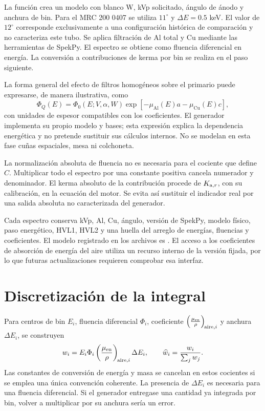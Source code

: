 La función  crea un modelo con blanco W, kVp solicitado, ángulo de ánodo y anchura de bin. Para el MRC 200 0407 se utiliza $11^\circ$ y $\Delta E=\num{0.5}$ keV. El valor de $12^\circ$ corresponde exclusivamente a una configuración histórica de comparación y no caracteriza este tubo. Se aplica filtración de Al total y Cu mediante las herramientas de SpekPy. El espectro se obtiene como fluencia diferencial en energía. La conversión a contribuciones de kerma por bin se realiza en el paso siguiente.

La forma general del efecto de filtros homogéneos sobre el primario puede expresarse, de manera ilustrativa, como
\begin{equation}
\Phi_Q(E)=\Phi_0(E;V,\alpha,W)\exp[-\mu_{\mathrm{Al}}(E)a-\mu_{\mathrm{Cu}}(E)c],
\end{equation}
con unidades de espesor compatibles con los coeficientes. El generador implementa su propio modelo y bases; esta expresión explica la dependencia energética y no pretende sustituir sus cálculos internos. No se modelan en esta fase cuñas espaciales, mesa ni colchoneta.

La normalización absoluta de fluencia no es necesaria para el cociente que define $C$. Multiplicar todo el espectro por una constante positiva cancela numerador y denominador. El kerma absoluto de la contribución procede de $K_{\mathrm{a},r}$, con su calibración, en la ecuación del motor. Se evita así sustituir el indicador real por una salida absoluta no caracterizada del generador.

Cada espectro conserva kVp, Al, Cu, ángulo, versión de SpekPy, modelo físico, paso energético, HVL1, HVL2 y una huella del arreglo de energías, fluencias y coeficientes. El modelo registrado en los archivos es . El acceso a los coeficientes de absorción de energía del aire utiliza un recurso interno de la versión fijada, por lo que futuras actualizaciones requieren comprobar esa interfaz.

\section{Discretización de la integral}
Para centros de bin $E_i$, fluencia diferencial $\Phi_i$, coeficiente $\left(\frac{\mu_{\mathrm{en}}}{\rho}\right)_{\!\mathrm{aire},i}$ y anchura $\Delta E_i$, se construyen
\begin{equation}\label{eq:weights}
w_i=E_i\Phi_i\left(\frac{\mu_{\mathrm{en}}}{\rho}\right)_{\!\mathrm{aire},i}\Delta E_i,
\qquad \widehat w_i=\frac{w_i}{\sum_j w_j}.
\end{equation}
Las constantes de conversión de energía y masa se cancelan en estos cocientes si se emplea una única convención coherente. La presencia de $\Delta E_i$ es necesaria para una fluencia diferencial. Si el generador entregase una cantidad ya integrada por bin, volver a multiplicar por su anchura sería un error.

